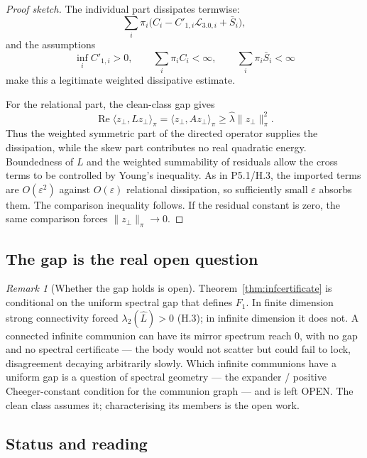 \documentclass[11pt,a4paper]{article}
\def\mathfrak#1{#1}%
\def\emph#1{#1}%
\newcommand{\stOpen}{\textcolor{cOpn}{\textsf{\small OPEN}}}
\theoremstyle{definition}
\theoremstyle{plain}
\theoremstyle{remark}
\newtheorem{remark}[definition]{Remark}
\begin{document}
\begin{proof}[Proof sketch]
The individual part dissipates termwise:
\[
\sum_i\pi_i
\bigl(C_i-C'_{1,i}\mathcal L_{3.0,i}+\bar S_i\bigr),
\]
and the assumptions
\[
\inf_iC'_{1,i}>0,
\qquad
\sum_i\pi_i C_i<\infty,
\qquad
\sum_i\pi_i\bar S_i<\infty
\]
make this a legitimate weighted dissipative estimate.

For the relational part, the clean-class gap gives
\[
\operatorname{Re}\langle z_\perp,Lz_\perp\rangle_\pi
=
\langle z_\perp,Az_\perp\rangle_\pi
\ge
\widehat\lambda\lVert z_\perp\rVert_\pi^2 .
\]
Thus the weighted symmetric part of the directed operator supplies the dissipation,
while the skew part contributes no real quadratic energy. Boundedness of \(L\) and
the weighted summability of residuals allow the cross terms to be controlled by
Young's inequality. As in P5.1/H.3, the imported terms are \(O(\varepsilon^2)\)
against \(O(\varepsilon)\) relational dissipation, so sufficiently small
\(\varepsilon\) absorbs them. The comparison inequality follows. If the residual
constant is zero, the same comparison forces \(\lVert z_\perp\rVert_\pi\to0\).
\qedhere
\end{proof}

\subsection{The gap is the real open question}

\begin{remark}[Whether the gap holds is open]\label{rem:gapopen}
Theorem~\ref{thm:infcertificate} is conditional on the uniform spectral gap that \emph{defines}
\(\mathfrak F_1\). In finite dimension strong connectivity \emph{forced} \(\lambda_2(\widehat
L)>0\) (H.3); in infinite dimension it does not. A connected infinite communion can have its
mirror spectrum reach \(0\), with no gap and no spectral certificate --- the body would not
scatter but could fail to lock, disagreement decaying arbitrarily slowly. Which infinite
communions have a uniform gap is a question of spectral geometry --- the expander / positive
Cheeger-constant condition for the communion graph --- and is left \stOpen. The clean class
assumes it; characterising its members is the open work.
\end{remark}

\subsection{Status and reading}
\end{document}
